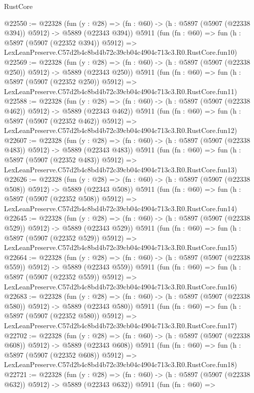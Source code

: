 \begin{lexlean}{RustCore}
\begin{coremodule}
@22550 := @22328
    (fun (y : @28) => (fn : @60) -> (h : @5897 (@5907 (@22338 @394)) @5912) -> @5889 (@22343 @394))
    @5911
    (fun (fn : @60) =>
    fun (h : @5897 (@5907 (@22352 @394)) @5912) =>
    LexLeanPreserve.C57d2b4c8bd4b72c39cb04c4904c713c3.R0.RustCore.fun10)
@22569 := @22328
    (fun (y : @28) => (fn : @60) -> (h : @5897 (@5907 (@22338 @250)) @5912) -> @5889 (@22343 @250))
    @5911
    (fun (fn : @60) =>
    fun (h : @5897 (@5907 (@22352 @250)) @5912) =>
    LexLeanPreserve.C57d2b4c8bd4b72c39cb04c4904c713c3.R0.RustCore.fun11)
@22588 := @22328
    (fun (y : @28) => (fn : @60) -> (h : @5897 (@5907 (@22338 @462)) @5912) -> @5889 (@22343 @462))
    @5911
    (fun (fn : @60) =>
    fun (h : @5897 (@5907 (@22352 @462)) @5912) =>
    LexLeanPreserve.C57d2b4c8bd4b72c39cb04c4904c713c3.R0.RustCore.fun12)
@22607 := @22328
    (fun (y : @28) => (fn : @60) -> (h : @5897 (@5907 (@22338 @483)) @5912) -> @5889 (@22343 @483))
    @5911
    (fun (fn : @60) =>
    fun (h : @5897 (@5907 (@22352 @483)) @5912) =>
    LexLeanPreserve.C57d2b4c8bd4b72c39cb04c4904c713c3.R0.RustCore.fun13)
@22626 := @22328
    (fun (y : @28) => (fn : @60) -> (h : @5897 (@5907 (@22338 @508)) @5912) -> @5889 (@22343 @508))
    @5911
    (fun (fn : @60) =>
    fun (h : @5897 (@5907 (@22352 @508)) @5912) =>
    LexLeanPreserve.C57d2b4c8bd4b72c39cb04c4904c713c3.R0.RustCore.fun14)
@22645 := @22328
    (fun (y : @28) => (fn : @60) -> (h : @5897 (@5907 (@22338 @529)) @5912) -> @5889 (@22343 @529))
    @5911
    (fun (fn : @60) =>
    fun (h : @5897 (@5907 (@22352 @529)) @5912) =>
    LexLeanPreserve.C57d2b4c8bd4b72c39cb04c4904c713c3.R0.RustCore.fun15)
@22664 := @22328
    (fun (y : @28) => (fn : @60) -> (h : @5897 (@5907 (@22338 @559)) @5912) -> @5889 (@22343 @559))
    @5911
    (fun (fn : @60) =>
    fun (h : @5897 (@5907 (@22352 @559)) @5912) =>
    LexLeanPreserve.C57d2b4c8bd4b72c39cb04c4904c713c3.R0.RustCore.fun16)
@22683 := @22328
    (fun (y : @28) => (fn : @60) -> (h : @5897 (@5907 (@22338 @580)) @5912) -> @5889 (@22343 @580))
    @5911
    (fun (fn : @60) =>
    fun (h : @5897 (@5907 (@22352 @580)) @5912) =>
    LexLeanPreserve.C57d2b4c8bd4b72c39cb04c4904c713c3.R0.RustCore.fun17)
@22702 := @22328
    (fun (y : @28) => (fn : @60) -> (h : @5897 (@5907 (@22338 @608)) @5912) -> @5889 (@22343 @608))
    @5911
    (fun (fn : @60) =>
    fun (h : @5897 (@5907 (@22352 @608)) @5912) =>
    LexLeanPreserve.C57d2b4c8bd4b72c39cb04c4904c713c3.R0.RustCore.fun18)
@22721 := @22328
    (fun (y : @28) => (fn : @60) -> (h : @5897 (@5907 (@22338 @632)) @5912) -> @5889 (@22343 @632))
    @5911
    (fun (fn : @60) =>

\end{coremodule}
\end{lexlean}
